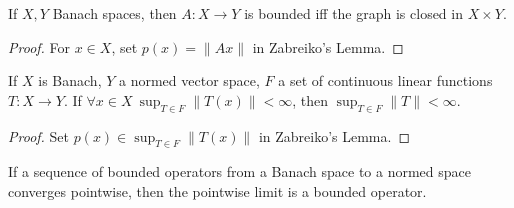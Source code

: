 \documentclass[letterpaper,11pt]{report}
\begin{document}
\begin{thm} If $X, Y$ Banach spaces, then $A:X\rightarrow Y$ is bounded iff the graph is closed in $X\times Y$.
\end{thm}
\begin{proof} For $x \in X$, set $p(x) = \|Ax\|$ in Zabreiko's Lemma.
\end{proof}

\begin{thm} If $X$ is Banach, $Y$ a normed vector space, $F$ a set of continuous linear functions $T:X\rightarrow Y$. If $\forall x \in X\ \sup_{T\in F} \|T(x)\| < \infty$, then $\sup_{T \in F} \|T\| < \infty$.
\end{thm}
\begin{proof} Set $p(x) \in \sup_{T\in F} \|T(x)\|$ in Zabreiko's Lemma.
\end{proof}

\begin{cor} If a sequence of bounded operators from a Banach space to a normed space converges pointwise, then the pointwise limit is a bounded operator.
\end{cor}




\end{document}
